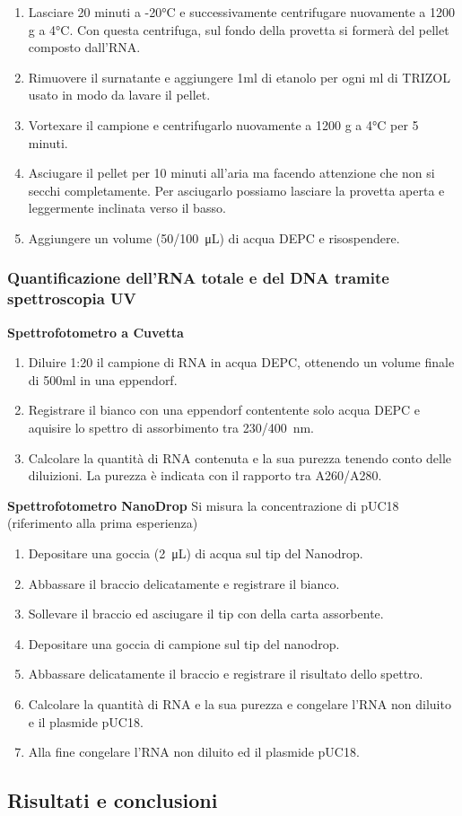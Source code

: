 \begin{enumerate}
\item Lasciare 20 minuti a -20°C e successivamente centrifugare nuovamente a 1200 g a 4°C. Con questa centrifuga, sul fondo della provetta si formerà del pellet composto dall’RNA.

\item Rimuovere il surnatante e aggiungere 1ml di etanolo per ogni ml di TRIZOL usato in modo da lavare il pellet.

\item Vortexare il campione e centrifugarlo nuovamente a 1200 g a 4°C per 5 minuti.

\item Asciugare il pellet per 10 minuti all’aria ma facendo attenzione che non si secchi completamente. Per asciugarlo possiamo lasciare la provetta aperta e leggermente inclinata verso il basso.

\item Aggiungere un volume (\SI{50/100}{\micro\liter}) di acqua DEPC e risospendere.
\end{enumerate}

\subsubsection{Quantificazione dell’RNA totale e del DNA tramite spettroscopia UV}

\textbf{Spettrofotometro a Cuvetta}
\vspace{0.5cm}

\begin{enumerate}
\item  Diluire 1:20 il campione di RNA in acqua DEPC, ottenendo un volume finale di 500ml in una eppendorf.
\item  Registrare il bianco con una eppendorf contentente solo acqua DEPC e aquisire lo spettro di assorbimento tra \SI{230/400}{\nano\meter}.
\item  Calcolare la quantità di RNA contenuta e la sua purezza tenendo conto delle diluizioni. La purezza è indicata con il rapporto tra A260/A280.
\end{enumerate}

\textbf{Spettrofotometro NanoDrop}
\vspace{0.5cm}
Si misura la concentrazione di pUC18 (riferimento alla prima esperienza)
\begin{enumerate}
\item Depositare una goccia (\SI{2}{\micro\liter}) di acqua sul tip del Nanodrop.
\item  Abbassare il braccio delicatamente e registrare il bianco.
\item  Sollevare il braccio ed asciugare il tip con della carta assorbente.
\item  Depositare una goccia di campione sul tip del nanodrop.
\item  Abbassare delicatamente il braccio e registrare il risultato dello spettro.
\item  Calcolare la quantità di RNA e la sua purezza e congelare l’RNA non diluito e il plasmide pUC18.
\item Alla fine congelare l'RNA non diluito ed il plasmide pUC18.
\end{enumerate}


\subsection{Risultati e conclusioni}


